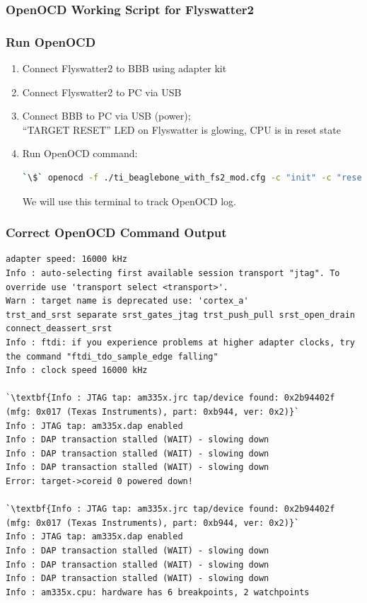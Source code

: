 \documentclass[aspectratio=169,usenames,dvipsnames]{beamer}
\newcounter{cont}
\begin{document}
\begin{frame}[containsverbatim,allowframebreaks=1]
  \frametitle{OpenOCD Working Script for Flyswatter2}
  
\end{frame}

\begin{frame}[containsverbatim]
  \frametitle{Run OpenOCD}
  \begin{enumerate}
  \item Connect Flyswatter2 to BBB using adapter kit
  \item Connect Flyswatter2 to PC via USB
  \item Connect BBB to PC via USB (power); \\
        ``TARGET RESET'' LED on Flyswatter is glowing, CPU is in reset state
  \item Run OpenOCD command:
    \begin{lstlisting}[language=bash,numbers=none]
`\$` openocd -f ./ti_beaglebone_with_fs2_mod.cfg -c "init" -c "reset init"
    \end{lstlisting}
  We will use this terminal to track OpenOCD log.
  \end{enumerate}
\end{frame}

\begin{frame}[containsverbatim]
  \frametitle{Correct OpenOCD Command Output}
  \vspace*{-5mm}
  \begin{lstlisting}[numbers=none]
adapter speed: 16000 kHz
Info : auto-selecting first available session transport "jtag". To override use 'transport select <transport>'.
Warn : target name is deprecated use: 'cortex_a'
trst_and_srst separate srst_gates_jtag trst_push_pull srst_open_drain connect_deassert_srst
Info : ftdi: if you experience problems at higher adapter clocks, try the command "ftdi_tdo_sample_edge falling"
Info : clock speed 16000 kHz

`\textbf{Info : JTAG tap: am335x.jrc tap/device found: 0x2b94402f (mfg: 0x017 (Texas Instruments), part: 0xb944, ver: 0x2)}`
Info : JTAG tap: am335x.dap enabled
Info : DAP transaction stalled (WAIT) - slowing down
Info : DAP transaction stalled (WAIT) - slowing down
Info : DAP transaction stalled (WAIT) - slowing down
Error: target->coreid 0 powered down!

`\textbf{Info : JTAG tap: am335x.jrc tap/device found: 0x2b94402f (mfg: 0x017 (Texas Instruments), part: 0xb944, ver: 0x2)}`
Info : JTAG tap: am335x.dap enabled
Info : DAP transaction stalled (WAIT) - slowing down
Info : DAP transaction stalled (WAIT) - slowing down
Info : DAP transaction stalled (WAIT) - slowing down
Info : am335x.cpu: hardware has 6 breakpoints, 2 watchpoints
  \end{lstlisting}
  \vspace*{-5mm}
\end{frame}
\end{document}
